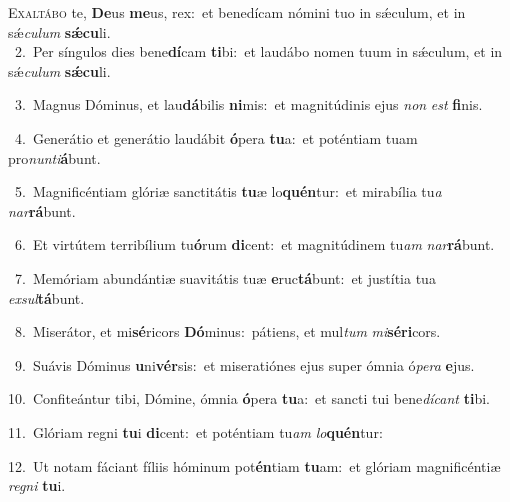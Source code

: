 \lettrine{\initial\textcolor{\initialcolor}{E}}{xaltábo} te, \textbf{De}\-us \textbf{me}\-us, rex:~\star et benedícam nómini tuo in sǽculum, et in sǽ\-\textit{cu}\-\textit{lum} \textbf{sǽ}\-\textbf{cu}li.\\
{\numbfont\textcolor{\numbcolor}{~2.}}~Per síngulos dies bene\-\textbf{dí}\-cam \textbf{ti}\-bi:~\star et laudábo nomen tuum in sǽculum, et in sǽ\-\textit{cu}\-\textit{lum} \textbf{sǽ}\-\textbf{cu}li.\par
{\numbfont\textcolor{\numbcolor}{~3.}}~Magnus Dóminus, et lau\-\textbf{dá}\-bilis \textbf{ni}\-mis:~\star et magnitúdinis ejus \textit{non} \textit{est} \textbf{fi}\-nis.\par
{\numbfont\textcolor{\numbcolor}{~4.}}~Generátio et generátio laudábit \textbf{ó}\-pera \textbf{tu}\-a:~\star et poténtiam tuam pro\-\textit{nun}\-\textit{ti}\textbf{á}bunt.\par
{\numbfont\textcolor{\numbcolor}{~5.}}~Magnificéntiam glóriæ sanctitátis \textbf{tu}\-æ lo\-\textbf{quén}\-tur:~\star et mirabília tu\textit{a} \textit{nar}\-\textbf{rá}bunt.\par
{\numbfont\textcolor{\numbcolor}{~6.}}~Et virtútem terribílium tu\-\textbf{ó}\-rum \textbf{di}\-cent:~\star et magnitúdinem tu\textit{am} \textit{nar}\-\textbf{rá}bunt.\par
{\numbfont\textcolor{\numbcolor}{~7.}}~Memóriam abundántiæ suavitátis tuæ \textbf{e}\-ruc\-\textbf{tá}\-bunt:~\star et justítia tua \textit{ex}\-\textit{sul}\textbf{tá}bunt.\par
{\numbfont\textcolor{\numbcolor}{~8.}}~Miserátor, et mi\-\textbf{sé}\-ricors \textbf{Dó}\-minus:~\star pátiens, et mul\textit{tum} \textit{mi}\-\textbf{sé}\textbf{ri}cors.\par
{\numbfont\textcolor{\numbcolor}{~9.}}~Suávis Dóminus \textbf{u}\-ni\-\textbf{vér}\-sis:~\star et miseratiónes ejus super ómnia ó\-\textit{pe}\-\textit{ra} \textbf{e}\-jus.\par
{\numbfont\textcolor{\numbcolor}{10.}}~Confiteántur tibi, Dómine, ómnia \textbf{ó}\-pera \textbf{tu}\-a:~\star et sancti tui bene\-\textit{dí}\-\textit{cant} \textbf{ti}\-bi.\par
{\numbfont\textcolor{\numbcolor}{11.}}~Glóriam regni \textbf{tu}\-i \textbf{di}\-cent:~\star et poténtiam tu\textit{am} \textit{lo}\-\textbf{quén}tur:\par
{\numbfont\textcolor{\numbcolor}{12.}}~Ut notam fáciant fíliis hóminum pot\-\textbf{én}\-tiam \textbf{tu}\-am:~\star et glóriam magnificéntiæ \textit{re}\-\textit{gni} \textbf{tu}\-i.\par
